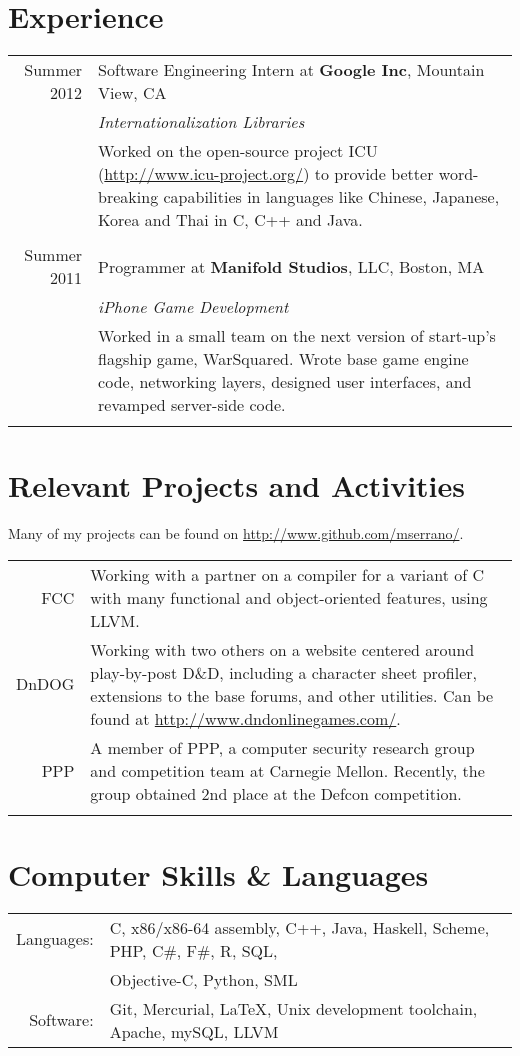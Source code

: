 \documentclass[10pt]{article}
\begin{document}
\section{Experience}
\begin{tabular}{r|p{11cm}}
Summer 2012 & Software Engineering Intern at \textbf{Google Inc}, Mountain View, CA \\
& \emph{Internationalization Libraries} \\
& \footnotesize{Worked on the open-source project ICU (\url{http://www.icu-project.org/}) to provide better
word-breaking capabilities in languages like Chinese, Japanese, Korea and Thai in C, C++ and Java.}\\
\multicolumn{2}{c}{}\\ %
Summer 2011 & Programmer at \textbf{Manifold Studios}, LLC, Boston, MA \\
& \emph{iPhone Game Development} \\
& \footnotesize{Worked in a small team on the next version of start-up's
flagship game, WarSquared. 
Wrote base game engine code, networking layers, designed user interfaces, and revamped server-side code.}\\
\multicolumn{2}{c}{}\\ %
\end{tabular}

\section{Relevant Projects and Activities}
Many of my projects can be found on \url{http://www.github.com/mserrano/}.

\begin{tabular}{r|p{11cm}}
FCC & \footnotesize{Working with a partner on a compiler for a variant of C 
with many functional and object-oriented features, using LLVM.}\\
DnDOG & \footnotesize{Working with two others on a website centered around
play-by-post D\&D, including a character sheet profiler, extensions to the base forums, 
and other utilities. Can be found at \url{http://www.dndonlinegames.com/}.}\\
PPP & \footnotesize{A member of PPP, a computer security research group 
and competition team at Carnegie Mellon. Recently, the group obtained 2nd place
at the Defcon competition.} \\
\multicolumn{2}{c}{}\\
\end{tabular}

\section{Computer Skills \& Languages}
\begin{tabular}{rl}
Languages: & C, x86/x86-64 assembly, C++, Java, Haskell, Scheme, PHP, C\#, F\#, R, SQL, \\
                    & Objective-C, Python, SML \\
Software: & Git, Mercurial, \LaTeX, Unix development toolchain, Apache, mySQL, LLVM \\
\end{tabular}
\end{document}
